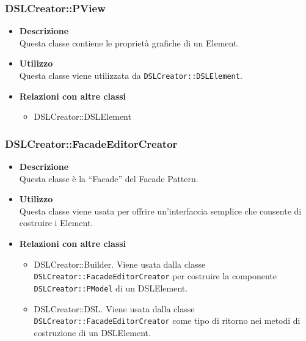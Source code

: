         \subsubsection{DSLCreator::PView}
        \begin{itemize}
        \item \textbf{Descrizione} \hfill \\
          Questa classe contiene le proprietà grafiche di un  Element.
        \item \textbf{Utilizzo}  \hfill \\
          Questa classe viene utilizzata da \texttt{DSLCreator::DSLElement}.
        \item \textbf{Relazioni con altre classi} \hfill 
          \begin{itemize}
          \item DSLCreator::DSLElement
          \end{itemize}
        \end{itemize}

        \subsubsection{DSLCreator::FacadeEditorCreator}
        \begin{itemize}
        \item \textbf{Descrizione} \hfill \\
          Questa classe è la ``Facade'' del Facade Pattern.
        \item \textbf{Utilizzo}  \hfill \\
          Questa classe viene usata per offrire un'interfaccia semplice che consente di costruire i  Element.
        \item \textbf{Relazioni con altre classi} \hfill 
          \begin{itemize}
          \item DSLCreator::Builder. Viene usata dalla classe \texttt{DSLCreator::FacadeEditorCreator} per costruire la componente \texttt{DSLCreator::PModel} di un DSLElement.
          \item DSLCreator::DSL. Viene usata dalla classe \texttt{DSLCreator::FacadeEditorCreator} come tipo di ritorno nei metodi di costruzione di un DSLElement.
          \end{itemize}
        \end{itemize}

